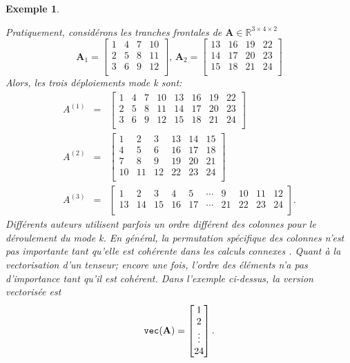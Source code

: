\documentclass[11pt,a4paper,oneside]{book}
\newtheorem{ex}{Exemple}[chapter]}
\def\R{\mathbb R}
\newcommand{\mbf}[1]{\mathbf{#1}}
\begin{document}
\begin{ex}
\begin{figure}[!h]
\end{figure}
\newpage
Pratiquement, considérons les tranches frontales de $ \mbf{A}\in\R^{3\times 4\times2} $\begin{equation}\label{(2.11)}
\mbf{A}_{1}=\begin{bmatrix}
1&4&7&10\\ 2&5&8&11\\3&6&9&12\\
\end{bmatrix},\, \mbf{A}_{2}=\begin{bmatrix}
13&16&19&22\\
14&17&20&23\\
15&18&21&24\\
\end{bmatrix}
\end{equation}
Alors, les trois déploiements mode k sont:
\begin{eqnarray}
A^{(1)}&=&\begin{bmatrix}
1&4&7&10&13&16&19&22\\
2&5&8&11&14&17&20&23\\
3&6&9&12&15&18&21&24\\
\end{bmatrix}\nonumber\\
A^{(2)}&=&\begin{bmatrix}
1&2&3&13&14&15\\
4&5&6&16&17&18\\
7&8&9&19&20&21\\
10&11&12&22&23&24\\
\end{bmatrix}\nonumber\\
A^{(3)}&=&\begin{bmatrix}
1&2&3&4&5&\cdots&9&10&11&12\\
13&14&15&16&17&\cdots&21&22&23&24\\
\end{bmatrix}.\nonumber
\end{eqnarray}
Différents auteurs utilisent parfois un ordre différent des colonnes pour le déroulement du mode k. En général, la permutation spécifique des colonnes n'est pas importante tant qu'elle est cohérente dans les calculs connexes \cite[p.460]{Hong2008}. Quant à la vectorisation d'un tenseur; encore une fois, l'ordre des éléments n'a pas d'importance tant qu'il est cohérent. Dans l'exemple ci-dessus, la version vectorisée est \begin{equation*}
\verb|vec|(\mbf{A})=\begin{bmatrix}
1\\2\\\vdots\\24
\end{bmatrix}.
\end{equation*}
\end{ex}
\end{document}
